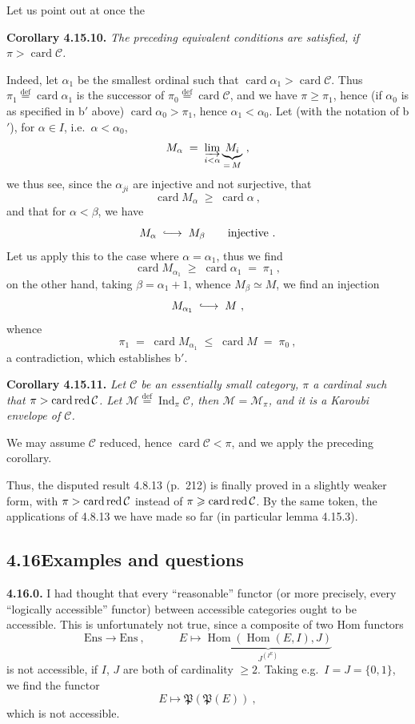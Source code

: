 \documentclass[11pt]{article}
\newcommand{\printedpage}[1]{\marginpar{\footnotesize p.~#1}}
\newcommand{\msp}[1]{\marginpar{\footnotesize [#1]}}
\newcommand{\card}{\operatorname{card}}
\newcommand{\redop}{\mathop{\textnormal{red}}\nolimits}
\newcommand{\Hom}{\operatorname{Hom}}
\newcommand{\Ind}{\operatorname{Ind}}
\newcommand{\Ens}{\mathrm{Ens}}
\newcommand{\defeq}{\overset{\text{def}}{=}}
\newcommand{\into}{\lhook\joinrel\longrightarrow}
\begin{document}
\printedpage{179}

Let us point out at once the

\textbf{Corollary 4.15.10.} \textit{The preceding equivalent conditions are satisfied, if $\pi > \card\mathcal{C}$.}

Indeed, let $\alpha_1$ be the smallest ordinal such that $\card\alpha_1 > \card\mathcal{C}$. Thus $\pi_1 \defeq \card\alpha_1$ is the successor of $\pi_0 \defeq \card\mathcal{C}$, and we have $\pi \geqslant \pi_1$, hence (if $\alpha_0$ is as specified in b$'$ above) $\card\alpha_0 > \pi_1$, hence $\alpha_1 < \alpha_0$. Let (with the notation of b$'$), for $\alpha \in I$, i.e.\ $\alpha < \alpha_0$,
\[
M_\alpha \;=\; \varinjlim_{i<\alpha} \underbrace{M_i}_{=\,M}\ ,
\]
we thus see, since the $\alpha_{ji}$ are injective and not surjective, that
\[
\card M_\alpha \;\geqslant\; \card\alpha\ ,
\]
\msp{463}
and that for $\alpha < \beta$, we have
\[
M_\alpha \;\into\; M_\beta \qquad \text{injective}\ .
\]
Let us apply this to the case where $\alpha = \alpha_1$, thus we find
\[
\card M_{\alpha_1} \;\geqslant\; \card\alpha_1 \;=\; \pi_1\ ,
\]
on the other hand, taking $\beta = \alpha_1 + 1$, whence $M_\beta \simeq M$, we find an injection
\[
M_{\alpha_1} \;\into\; M\ ,
\]
whence
\[
\pi_1 \;=\; \card M_{\alpha_1} \;\leqslant\; \card M \;=\; \pi_0\ ,
\]
a contradiction, which establishes b$'$.

\textbf{Corollary 4.15.11.} \textit{Let $\mathcal{C}$ be an essentially small category, $\pi$ a cardinal such that $\pi > \card\redop\mathcal{C}$. Let $\mathcal{M} \defeq \Ind_\pi\mathcal{C}$, then $\mathcal{M} = \mathcal{M}_\pi$, and it is a Karoubi envelope of $\mathcal{C}$.}

We may assume $\mathcal{C}$ reduced, hence $\card\mathcal{C} < \pi$, and we apply the preceding corollary.

Thus, the disputed result 4.8.13 (p.~212) is finally proved in a slightly weaker form, with $\pi > \card\redop\mathcal{C}$ instead of $\pi \geqslant \card\redop\mathcal{C}$. By the same token, the applications of 4.8.13 we have made so far (in particular lemma 4.15.3).

\msp{464}

\subsection*{4.16\quad Examples and questions}

\textbf{4.16.0.} I had thought that every ``reasonable'' functor (or more precisely, every ``logically accessible'' functor) between accessible categories ought to be accessible. This is unfortunately not true, since a composite of two Hom functors
\[
\Ens \longrightarrow \Ens\ , \qquad\quad E \longmapsto \underbrace{\Hom(\Hom(E,I),J)}_{J^{(I^E)}}
\]
\printedpage{180}
is not accessible, if $I$, $J$ are both of cardinality $\geqslant 2$. Taking e.g.\ $I = J = \{0,1\}$, we find the functor
\[
E \longmapsto \mathfrak{P}(\mathfrak{P}(E))\ ,
\]
which is not accessible.
\end{document}
